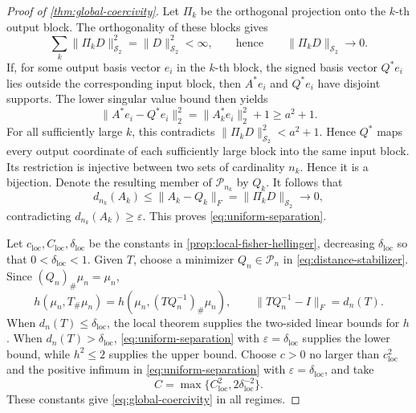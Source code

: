 \begin{proof}[Proof of \cref{thm:global-coercivity}]
Let \(\Pi_k\) be the orthogonal projection onto the \(k\)-th output block.
The orthogonality of these blocks gives
\[
 \sum_k\|\Pi_kD\|_{\mathcal S_2}^2=\|D\|_{\mathcal S_2}^2<\infty,
 \qquad\text{hence}\qquad
 \|\Pi_kD\|_{\mathcal S_2}\longrightarrow0.
 \]
If, for some output basis vector \(e_i\) in the \(k\)-th block, the signed
basis vector \(Q^*e_i\) lies outside the corresponding input block, then
\(A^*e_i\) and \(Q^*e_i\) have disjoint supports.
The lower singular value bound then yields
\begin{equation}
 \|A^*e_i-Q^*e_i\|_2^2
 =\|A_k^*e_i\|_2^2+1\ge a^2+1.
 \label{eq:row-escape-cost}
 \end{equation}
For all sufficiently large \(k\), this contradicts
\(\|\Pi_kD\|_{\mathcal S_2}^2<a^2+1\).
Hence \(Q^*\) maps every output coordinate of each sufficiently large block
into the same input block.
Its restriction is injective between two sets of cardinality \(n_k\).
Hence it is a bijection.
Denote the resulting member of \(\mathcal P_{n_k}\) by
\(Q_k\).  It follows that
\[
 d_{n_k}(A_k)
 \le\|A_k-Q_k\|_F
 =\|\Pi_kD\|_{\mathcal S_2}\longrightarrow0,
\]
contradicting \(d_{n_k}(A_k)\ge\varepsilon\).  This proves
\eqref{eq:uniform-separation}.

Let \(c_{\mathrm{loc}},C_{\mathrm{loc}},\delta_{\mathrm{loc}}\) be the
constants in \cref{prop:local-fisher-hellinger}, decreasing
\(\delta_{\mathrm{loc}}\) so that \(0<\delta_{\mathrm{loc}}<1\).
Given \(T\), choose a minimizer
\(Q_n\in\mathcal P_n\) in \eqref{eq:distance-stabilizer}.  Since
\((Q_n)_\#\mu_n=\mu_n\),
\[
 h(\mu_n,T_\#\mu_n)
 =h(\mu_n,(TQ_n^{-1})_\#\mu_n),
 \qquad
 \|TQ_n^{-1}-I\|_F=d_n(T).
\]
When \(d_n(T)\le\delta_{\mathrm{loc}}\), the local theorem supplies the
two-sided linear bounds for \(h\).  When
\(d_n(T)>\delta_{\mathrm{loc}}\),
\eqref{eq:uniform-separation} with
\(\varepsilon=\delta_{\mathrm{loc}}\) supplies the lower bound, while
\(h^2\le2\) supplies the upper bound.  Choose $c>0$ no larger than
$c_{\mathrm{loc}}^2$ and
the positive infimum in \eqref{eq:uniform-separation} with
$\varepsilon=\delta_{\mathrm{loc}}$, and take
\[
 C=\max\{C_{\mathrm{loc}}^2,2\delta_{\mathrm{loc}}^{-2}\}.
\]
These constants give \eqref{eq:global-coercivity} in all regimes.
\end{proof}

